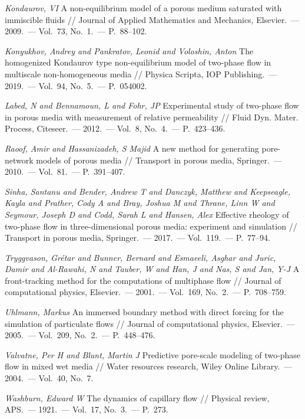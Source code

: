 \documentclass{crm-article}
\begin{document}
\begin{thebibliography}{100}
		 \textit{Kondaurov, VI} A non-equilibrium model of a porous medium saturated with immiscible fluids // Journal of Applied Mathematics and Mechanics, Elsevier.~--- 2009.~---  Vol.~73, No.~1.~--- P.~88--102.

		 \textit{Konyukhov, Andrey and Pankratov, Leonid and Voloshin, Anton} The homogenized Kondaurov type non-equilibrium model of two-phase flow in multiscale non-homogeneous media // Physica Scripta, IOP Publishing.~--- 2019.~---  Vol.~94, No.~5.~--- P.~054002.

		 \textit{Labed, N and Bennamoun, L and Fohr, JP} Experimental study of two-phase flow in porous media with measurement of relative permeability // Fluid Dyn. Mater. Process, Citeseer.~--- 2012.~---  Vol.~8, No.~4.~--- P.~423--436.

		 \textit{Raoof, Amir and Hassanizadeh, S Majid} A new method for generating pore-network models of porous media // Transport in porous media, Springer.~--- 2010.~---  Vol.~81.~--- P.~391--407.

		 \textit{Sinha, Santanu and Bender, Andrew T and Danczyk, Matthew and Keepseagle, Kayla and Prather, Cody A and Bray, Joshua M and Thrane, Linn W and Seymour, Joseph D and Codd, Sarah L and Hansen, Alex} Effective rheology of two-phase flow in three-dimensional porous media: experiment and simulation // Transport in porous media, Springer.~--- 2017.~---  Vol.~119.~--- P.~77--94.

		 \textit{Tryggvason, Gr{\'e}tar and Bunner, Bernard and Esmaeeli, Asghar and Juric, Damir and Al-Rawahi, N and Tauber, W and Han, J and Nas, S and Jan, Y-J} A front-tracking method for the computations of multiphase flow // Journal of computational physics, Elsevier.~--- 2001.~---  Vol.~169, No.~2.~--- P.~708--759.

		 \textit{Uhlmann, Markus} An immersed boundary method with direct forcing for the simulation of particulate flows // Journal of computational physics, Elsevier.~--- 2005.~---  Vol.~209, No.~2.~--- P.~448--476.

		 \textit{Valvatne, Per H and Blunt, Martin J} Predictive pore-scale modeling of two-phase flow in mixed wet media // Water resources research, Wiley Online Library.~--- 2004.~---  Vol.~40, No.~7.

		 \textit{Washburn, Edward W} The dynamics of capillary flow // Physical review, APS.~--- 1921.~---  Vol.~17, No.~3.~--- P.~273.

	\end{thebibliography}
	
	
\end{document}
